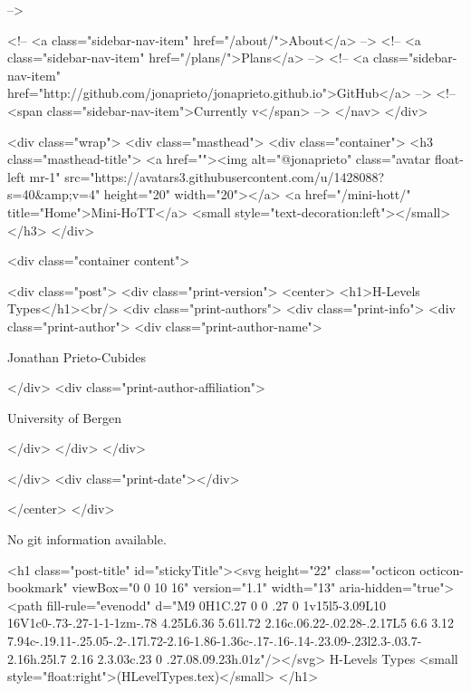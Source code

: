       
     -->

    <!-- <a class="sidebar-nav-item" href="/about/">About</a> -->
    <!-- <a class="sidebar-nav-item" href="/plans/">Plans</a> -->
    <!-- <a class="sidebar-nav-item" href="http://github.com/jonaprieto/jonaprieto.github.io">GitHub</a> -->
    <!-- <span class="sidebar-nav-item">Currently v</span> -->
  </nav>
</div>

    <div class="wrap">
      <div class="masthead">
        <div class="container">
          <h3 class="masthead-title">
            <a href=""><img alt="@jonaprieto" class="avatar float-left mr-1" src="https://avatars3.githubusercontent.com/u/1428088?s=40&amp;v=4" height="20" width="20"></a>
            <a href="/mini-hott/" title="Home">Mini-HoTT</a>
            <small style="text-decoration:left"></small>
          </h3>
        </div>
      
      <div class="container content">
        







<div class="post">
  <div class="print-version">
    <center>
      <h1>H-Levels Types</h1><br/>
        <div class="print-authors">
          <div class="print-info">
            <div class="print-author">
              <div class="print-author-name">
                
                  Jonathan Prieto-Cubides
                
              </div>
              <div class="print-author-affiliation">
                
                  University of Bergen
                
                </div>
            </div>
          </div>
          
          
        </div>
        <div class="print-date"></div>
        
        
    </center>
  </div>

  
  No git information available.
  

  <h1 class="post-title" id="stickyTitle"><svg height="22" class="octicon octicon-bookmark" viewBox="0 0 10 16" version="1.1" width="13" aria-hidden="true"><path fill-rule="evenodd" d="M9 0H1C.27 0 0 .27 0 1v15l5-3.09L10 16V1c0-.73-.27-1-1-1zm-.78 4.25L6.36 5.61l.72 2.16c.06.22-.02.28-.2.17L5 6.6 3.12 7.94c-.19.11-.25.05-.2-.17l.72-2.16-1.86-1.36c-.17-.16-.14-.23.09-.23l2.3-.03.7-2.16h.25l.7 2.16 2.3.03c.23 0 .27.08.09.23h.01z"/></svg> H-Levels Types <small style="float:right">(HLevelTypes.tex)</small>
  </h1>

